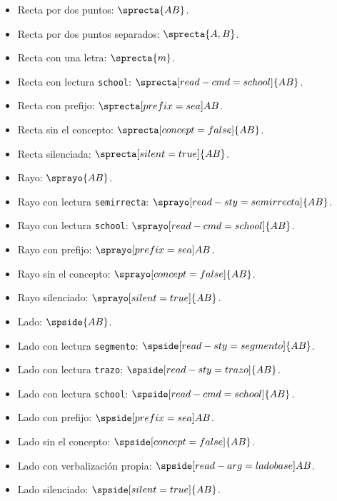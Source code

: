 \documentclass{article}
\begin{document}
\begin{itemize}
  \item Recta por dos puntos: $\sprecta{AB}$.
  \item Recta por dos puntos separados: $\sprecta{A,B}$.
  \item Recta con una letra: $\sprecta{m}$.
  \item Recta con lectura \texttt{school}: $\sprecta[read-cmd=school]{AB}$.
  \item Recta con prefijo: $\sprecta[prefix={sea}]{AB}$.
  \item Recta sin el concepto: $\sprecta[concept=false]{AB}$.
  \item Recta silenciada: $\sprecta[silent=true]{AB}$.
  \item Rayo: $\sprayo{AB}$.
  \item Rayo con lectura \texttt{semirrecta}: $\sprayo[read-sty=semirrecta]{AB}$.
  \item Rayo con lectura \texttt{school}: $\sprayo[read-cmd=school]{AB}$.
  \item Rayo con prefijo: $\sprayo[prefix={sea}]{AB}$.
  \item Rayo sin el concepto: $\sprayo[concept=false]{AB}$.
  \item Rayo silenciado: $\sprayo[silent=true]{AB}$.
  \item Lado: $\spside{AB}$.
  \item Lado con lectura \texttt{segmento}: $\spside[read-sty=segmento]{AB}$.
  \item Lado con lectura \texttt{trazo}: $\spside[read-sty=trazo]{AB}$.
  \item Lado con lectura \texttt{school}: $\spside[read-cmd=school]{AB}$.
  \item Lado con prefijo: $\spside[prefix={sea}]{AB}$.
  \item Lado sin el concepto: $\spside[concept=false]{AB}$.
  \item Lado con verbalización propia: $\spside[read-arg={lado base}]{AB}$.
  \item Lado silenciado: $\spside[silent=true]{AB}$.

\end{itemize}
\end{document}
